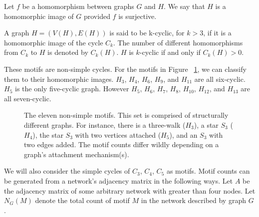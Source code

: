 \begin{dfn}
    Let $f$ be a homomorphism between graphs $G$ and $H$. We say that $H$ is a
    homomorphic image of $G$ provided $f$ is surjective.
\end{dfn}

\begin{dfn}
    A graph $H = (V(H), E(H))$ is said to be k-cyclic, for $k > 3$, if it is a
homomorphic image of the cycle $C_k$. The number of different homomorphisms from $C_k$
to $H$ is denoted by $C_k(H)$.  $H$ is $k$-cyclic if and only if $C_k(H) > 0$.
\end{dfn}

These motifs are non-simple cycles. For the motifs in Figure ~\ref{fig:motifs1}, we can classify them to their homomorphic images. $H_{3}$, $H_{4}$, $H_{6}$, $H_{9}$, and $H_{11}$ are all six-cyclic. $H_{5}$
is the only five-cyclic graph. However $H_{5}$, $H_{6}$, $H_{7}$, $H_{8}$, $H_{10}$, $H_{12}$, and $H_{13}$ are 
all seven-cyclic.

\begin{figure}[ht!]
    \centering
    \caption{The eleven non-simple motifs. This set is comprised
    of structurally different graphs. For instance, there is a three-walk ($H_{3}$), a star $S_3$ ($H_{4}$), the star $S_3$ with two vertices
    attached ($H_{5}$), and an $S_3$ with two edges added. The motif counts differ wildly depending on a graph's attachment mechanism(s). \label{fig:motifs1}}
\end{figure}



\FloatBarrier

\vspace{3mm} 

We will also consider the simple cycles of $C_3$, $C_4$, $C_5$ as motifs. Motif counts can be generated from a network's adjacency matrix in the following ways. Let $A$
be the adjacency matrix of some arbitrary network with greater than four nodes. Let $N_G(M)$ denote 
the total count of motif $M$ in the network described by graph $G$. 

